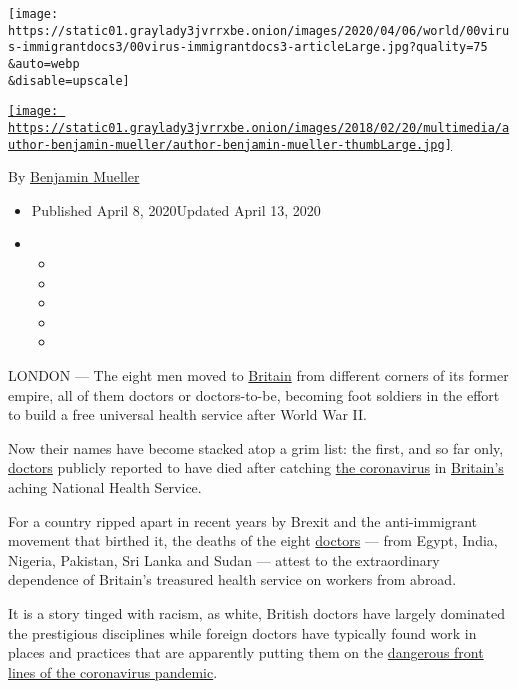 \texttt{[image: https://static01.graylady3jvrrxbe.onion/images/2020/04/06/world/00virus-immigrantdocs3/00virus-immigrantdocs3-articleLarge.jpg?quality=75\\\&auto=webp\\\&disable=upscale]}

\href{https://www.nytimes3xbfgragh.onion/by/benjamin-mueller}{\texttt{[image: https://static01.graylady3jvrrxbe.onion/images/2018/02/20/multimedia/author-benjamin-mueller/author-benjamin-mueller-thumbLarge.jpg]}}

By
\href{https://www.nytimes3xbfgragh.onion/by/benjamin-mueller}{Benjamin
Mueller}

\begin{itemize}
\item
  Published April 8, 2020Updated April 13, 2020
\item
  \begin{itemize}
  \item
  \item
  \item
  \item
  \item
  \end{itemize}
\end{itemize}

LONDON --- The eight men moved to
\href{https://www.nytimes3xbfgragh.onion/2020/04/10/technology/coronavirus-5g-uk.html}{Britain}
from different corners of its former empire, all of them doctors or
doctors-to-be, becoming foot soldiers in the effort to build a free
universal health service after World War II.

Now their names have become stacked atop a grim list: the first, and so
far only,
\href{https://www.nytimes3xbfgragh.onion/2020/04/13/us/coronavirus-foreign-doctors-nurses-visas.html}{doctors}
publicly reported to have died after catching
\href{https://www.nytimes3xbfgragh.onion/2020/04/09/podcasts/the-daily/coronavirus-new-orleans.html}{the
coronavirus} in
\href{https://www.nytimes3xbfgragh.onion/2020/04/10/technology/coronavirus-5g-uk.html}{Britain's}
aching National Health Service.

For a country ripped apart in recent years by Brexit and the
anti-immigrant movement that birthed it, the deaths of the eight
\href{https://www.nytimes3xbfgragh.onion/2020/04/13/us/coronavirus-foreign-doctors-nurses-visas.html}{doctors}
--- from Egypt, India, Nigeria, Pakistan, Sri Lanka and Sudan --- attest
to the extraordinary dependence of Britain's treasured health service on
workers from abroad.

It is a story tinged with racism, as white, British doctors have largely
dominated the prestigious disciplines while foreign doctors have
typically found work in places and practices that are apparently putting
them on the
\href{https://www.nytimes3xbfgragh.onion/2020/03/05/world/europe/coronavirus-united-kingdom-national-health-service.html}{dangerous
front lines of the coronavirus pandemic}.

